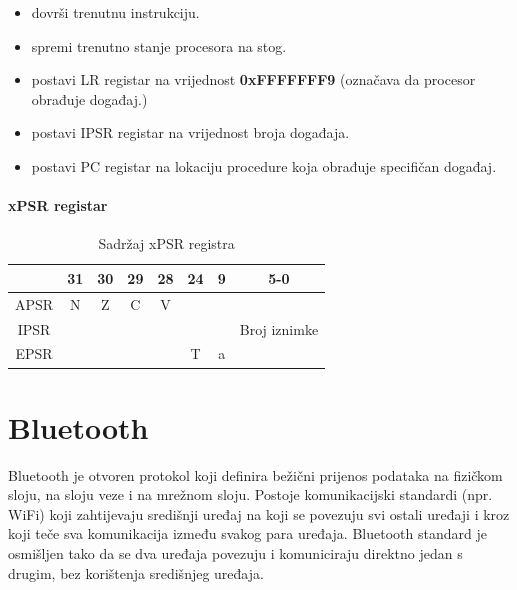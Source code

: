 \documentclass[times, utf8, diplomski]{diplomski}
\begin{document}
\begin{itemize}
  \item dovrši trenutnu instrukciju.
  \item spremi trenutno stanje procesora na stog.
  \item postavi LR registar na vrijednost \textbf{0xFFFFFFF9} (označava da procesor obrađuje događaj.)
  \item postavi IPSR registar na vrijednost broja događaja.
  \item postavi PC registar na lokaciju procedure koja obrađuje specifičan događaj.
\end{itemize}

\subsubsection{xPSR registar}

\begin{table}[H]
  \begin{center}
    \begin{tabular}{c|c|c|c|c||c||c||c|}
      \cline{2-8} & 31 & 30 & 29 & 28 & 24 & 9 & 5-0\\
      \hline
      \multicolumn{1}{|c|}{APSR} & N & Z & C & V & \multicolumn{3}{c|}{ } \\
      \hline
      \multicolumn{1}{|c|}{IPSR} & \multicolumn{6}{c||}{ } & Broj iznimke \\
      \hline
      \multicolumn{1}{|c|}{EPSR} & \multicolumn{4}{c||}{ } & T & a & \\
      \hline
    \end{tabular}
    \caption{Sadržaj xPSR registra}
  \end{center}
\end{table}

\newpage

\chapter{Bluetooth}

Bluetooth \cite{core41} je otvoren protokol koji definira bežični prijenos podataka na fizičkom sloju, na sloju veze i na mrežnom sloju.
Postoje komunikacijski standardi (npr. WiFi) koji zahtijevaju središnji uređaj na koji se povezuju svi ostali uređaji i kroz koji teče sva komunikacija između svakog para uređaja.
Bluetooth standard je osmišljen tako da se dva uređaja povezuju i komuniciraju direktno jedan s drugim, bez korištenja središnjeg uređaja.
\end{document}
